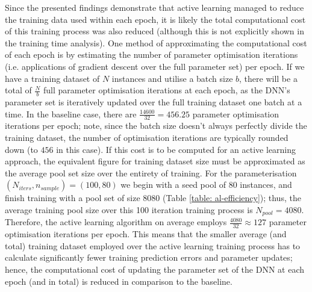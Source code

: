 \documentclass[a4paper, 11pt]{report}
\begin{document}
    Since the presented findings demonstrate that active learning managed to reduce the training data used within each epoch, it is likely the total computational cost of this training process was also reduced (although this is not explicitly shown in the training time analysis). One method of approximating the computational cost of each epoch is by estimating the number of parameter optimisation iterations (i.e. applications of gradient descent over the full parameter set) per epoch. If we have a training dataset of $N$ instances and utilise a batch size $b$, there will be a total of $\frac{N}{b}$ full parameter optimisation iterations at each epoch, as the DNN's parameter set is iteratively updated over the full training dataset one batch at a time. In the baseline case, there are $\frac{14600}{32} = 456.25$ parameter optimisation iterations per epoch; note, since the batch size doesn't always perfectly divide the training dataset, the number of optimisation iterations are typically rounded down (to $456$ in this case). If this cost is to be computed for an active learning approach, the equivalent figure for training dataset size must be approximated as the average pool set size over the entirety of training. For the parameterisation $(N_{iters}, n_{sample}) = (100, 80)$ we begin with a seed pool of $80$ instances, and finish training with a pool set of size $8080$ (Table \ref{table: al-efficiency}); thus, the average training pool size over this 100 iteration training process is $N_{pool} = 4080$. Therefore, the active learning algorithm on average employs $\frac{4080}{32} \approx 127$ parameter optimisation iterations per epoch. This means that the smaller average (and total) training dataset employed over the active learning training process has to calculate significantly fewer training prediction errors and parameter updates; hence, the computational cost of updating the parameter set of the DNN at each epoch (and in total) is reduced in comparison to the baseline.
\end{document}
